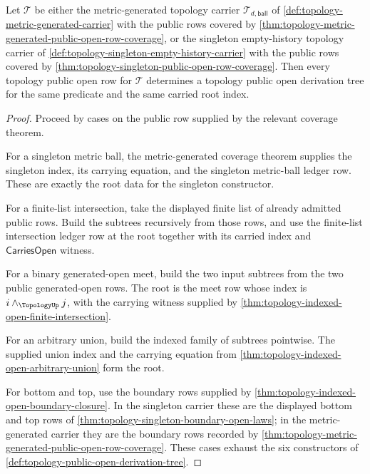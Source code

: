 \begin{theorem}
\label{thm:topology-public-open-derivation-tree-coverage}
Let $\mathcal{T}$ be either the metric-generated topology carrier $\mathcal{T}_{d,\mathsf{ball}}$ of \autoref{def:topology-metric-generated-carrier} with the public rows covered by \autoref{thm:topology-metric-generated-public-open-row-coverage}, or the singleton empty-history topology carrier of \autoref{def:topology-singleton-empty-history-carrier} with the public rows covered by \autoref{thm:topology-singleton-public-open-row-coverage}. Then every topology public open row for $\mathcal{T}$ determines a topology public open derivation tree for the same predicate and the same carried root index.
\end{theorem}
\begin{proof}
Proceed by cases on the public row supplied by the relevant coverage theorem.

For a singleton metric ball, the metric-generated coverage theorem supplies the singleton index, its carrying equation, and the singleton metric-ball ledger row. These are exactly the root data for the singleton constructor.

For a finite-list intersection, take the displayed finite list of already admitted public rows. Build the subtrees recursively from those rows, and use the finite-list intersection ledger row at the root together with its carried index and $\mathsf{CarriesOpen}$ witness.

For a binary generated-open meet, build the two input subtrees from the two public generated-open rows. The root is the meet row whose index is $i\wedge_{\TopologyUp}j$, with the carrying witness supplied by \autoref{thm:topology-indexed-open-finite-intersection}.

For an arbitrary union, build the indexed family of subtrees pointwise. The supplied union index and the carrying equation from \autoref{thm:topology-indexed-open-arbitrary-union} form the root.

For bottom and top, use the boundary rows supplied by \autoref{thm:topology-indexed-open-boundary-closure}. In the singleton carrier these are the displayed bottom and top rows of \autoref{thm:topology-singleton-boundary-open-laws}; in the metric-generated carrier they are the boundary rows recorded by \autoref{thm:topology-metric-generated-public-open-row-coverage}. These cases exhaust the six constructors of \autoref{def:topology-public-open-derivation-tree}.
\end{proof}

